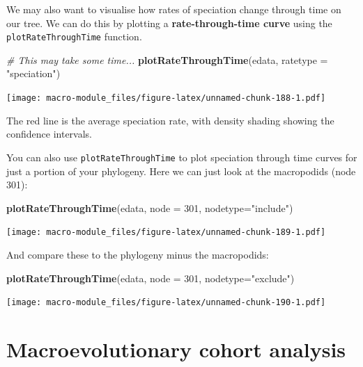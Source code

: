 \documentclass[]{book}
\newenvironment{Shaded}{\begin{snugshade}}{\end{snugshade}}
\newcommand{\KeywordTok}[1]{\textcolor[rgb]{0.13,0.29,0.53}{\textbf{{#1}}}}
\newcommand{\DataTypeTok}[1]{\textcolor[rgb]{0.13,0.29,0.53}{{#1}}}
\newcommand{\DecValTok}[1]{\textcolor[rgb]{0.00,0.00,0.81}{{#1}}}
\newcommand{\StringTok}[1]{\textcolor[rgb]{0.31,0.60,0.02}{{#1}}}
\newcommand{\CommentTok}[1]{\textcolor[rgb]{0.56,0.35,0.01}{\textit{{#1}}}}
\newcommand{\NormalTok}[1]{{#1}}
\theoremstyle{definition}
\theoremstyle{definition}
\theoremstyle{definition}
\theoremstyle{remark}
\begin{document}
We may also want to visualise how rates of speciation change through
time on our tree. We can do this by plotting a \textbf{rate-through-time
curve} using the \texttt{plotRateThroughTime} function.

\begin{Shaded}
\begin{Highlighting}[]
\CommentTok{# This may take some time...}
\KeywordTok{plotRateThroughTime}\NormalTok{(edata, }\DataTypeTok{ratetype =} \StringTok{"speciation"}\NormalTok{)}
\end{Highlighting}
\end{Shaded}

\texttt{[image: macro-module\_files/figure-latex/unnamed-chunk-188-1.pdf]}

The red line is the average speciation rate, with density shading
showing the confidence intervals.

You can also use \texttt{plotRateThroughTime} to plot speciation through
time curves for just a portion of your phylogeny. Here we can just look
at the macropodids (node 301):

\begin{Shaded}
\begin{Highlighting}[]
\KeywordTok{plotRateThroughTime}\NormalTok{(edata, }\DataTypeTok{node =} \DecValTok{301}\NormalTok{, }\DataTypeTok{nodetype=}\StringTok{"include"}\NormalTok{)}
\end{Highlighting}
\end{Shaded}

\texttt{[image: macro-module\_files/figure-latex/unnamed-chunk-189-1.pdf]}

And compare these to the phylogeny minus the macropodids:

\begin{Shaded}
\begin{Highlighting}[]
\KeywordTok{plotRateThroughTime}\NormalTok{(edata, }\DataTypeTok{node =} \DecValTok{301}\NormalTok{, }\DataTypeTok{nodetype=}\StringTok{"exclude"}\NormalTok{)}
\end{Highlighting}
\end{Shaded}

\texttt{[image: macro-module\_files/figure-latex/unnamed-chunk-190-1.pdf]}

\section{Macroevolutionary cohort
analysis}\label{macroevolutionary-cohort-analysis}
\end{document}
